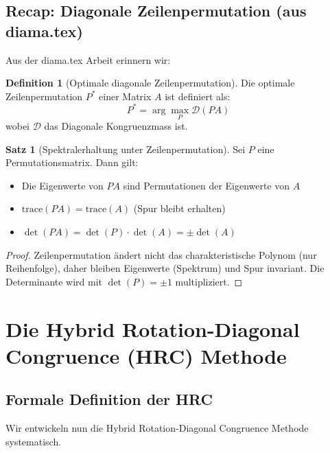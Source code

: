 \documentclass[a4paper,12pt]{article}
\theoremstyle{definition}
\newtheorem{definition}{Definition}
\newtheorem{satz}{Satz}
\begin{document}
\subsection{Recap: Diagonale Zeilenpermutation (aus diama.tex)}

Aus der diama.tex Arbeit erinnern wir:

\begin{definition}[Optimale diagonale Zeilenpermutation]
	Die optimale Zeilenpermutation $P^*$ einer Matrix $A$ ist definiert als:
	\[
	P^* = \arg\max_{P} \mathcal{D}(PA)
	\]
	wobei $\mathcal{D}$ das Diagonale Kongruenzmass ist.
\end{definition}

\begin{satz}[Spektralerhaltung unter Zeilenpermutation]
	Sei $P$ eine Permutationsmatrix. Dann gilt:
	\begin{itemize}
		\item Die Eigenwerte von $PA$ sind Permutationen der Eigenwerte von $A$
		\item $\text{trace}(PA) = \text{trace}(A)$ (Spur bleibt erhalten)
		\item $\det(PA) = \det(P) \cdot \det(A) = \pm \det(A)$
	\end{itemize}
\end{satz}

\begin{proof}
	Zeilenpermutation ändert nicht das charakteristische Polynom (nur Reihenfolge), daher bleiben Eigenwerte (Spektrum) und Spur invariant. Die Determinante wird mit $\det(P) = \pm 1$ multipliziert.
\end{proof}

\section{Die Hybrid Rotation-Diagonal Congruence (HRC) Methode}

\subsection{Formale Definition der HRC}

Wir entwickeln nun die Hybrid Rotation-Diagonal Congruence Methode systematisch.
\end{document}
